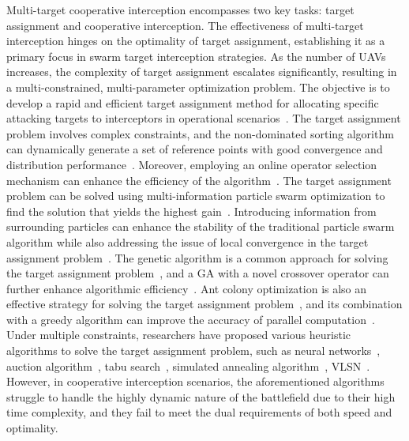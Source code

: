 \documentclass[lettersize,journal]{IEEEtran}
\begin{document}
Multi-target cooperative interception encompasses two key tasks: target assignment and
cooperative interception.
The effectiveness of multi-target interception hinges on the optimality of target assignment,
establishing it as a primary focus in swarm target interception strategies.
As the number of UAVs increases, the complexity of target assignment escalates significantly,
resulting in a multi-constrained, multi-parameter optimization problem.
The objective is to develop a rapid and efficient target assignment method for allocating
specific attacking targets to interceptors in operational scenarios~\cite{KLINE2019226}.
The target assignment problem involves complex constraints, and the non-dominated sorting
algorithm can dynamically generate a set of reference points with good convergence and
distribution performance~\cite{WANG2025952,bai2024hybrid,zou2024moea}.
Moreover, employing an online operator selection mechanism can enhance the efficiency of the
algorithm~\cite{ahmad2024fuzzy,ming2024constrained}.
The target assignment problem can be solved using multi-information particle swarm optimization
to find the solution that yields the highest gain~\cite{mishra2015weapon,wei2020particle}.
Introducing information from surrounding particles can enhance the stability of the traditional
particle swarm algorithm while also addressing the issue of local convergence in the target
assignment problem~\cite{long2024improved}.
The genetic algorithm is a common approach for solving the target assignment
problem~\cite{he4914655modelling,li2020multi,sun2022multi,chang2018solving}, and a GA with a
novel crossover operator can further enhance algorithmic efficiency~\cite{weng2024diversity}.
Ant colony optimization is also an effective strategy for solving the target assignment
problem~\cite{li2024comprehensive}, and its combination with a greedy algorithm can improve
the accuracy of parallel computation~\cite{yi2024solving}.
Under multiple constraints, researchers have proposed various heuristic algorithms to solve the
target assignment problem, such as neural networks~\cite{li2024comprehensive}, auction
algorithm~\cite{wang2024collaborative}, tabu search~\cite{yao2024tabu}, simulated annealing
algorithm~\cite{khurshid2024hybrid}, VLSN~\cite{yue2024graph}.
However, in cooperative interception scenarios, the aforementioned algorithms struggle to
handle the highly dynamic nature of the battlefield due to their high time complexity, and they
fail to meet the dual requirements of both speed and optimality.
\end{document}
